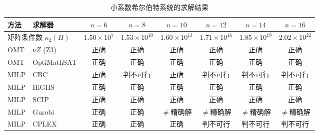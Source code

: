 \begin{table}[!htbp]
\centering
\caption{小系数希尔伯特系统的求解结果}
\label{tab:exp-illcond}
\footnotesize
\setlength{\tabcolsep}{4pt}
\begin{tabular}{@{}ll cccccc@{}}
\toprule
\textbf{方法} & \textbf{求解器} & $n{=}6$ & $n{=}8$ & $n{=}10$ & $n{=}12$ & $n{=}14$ & $n{=}16$ \\
\midrule
\multicolumn{2}{l}{矩阵条件数 $\kappa_2(H)$} & $1.50\!\times\!10^7$ & $1.53\!\times\!10^{10}$ & $1.60\!\times\!10^{13}$ & $1.71\!\times\!10^{16}$ & $1.85\!\times\!10^{19}$ & $2.02\!\times\!10^{22}$ \\
\midrule
OMT  & $\nu Z$ (Z3)  & 正确 & 正确 & 正确 & 正确 & 正确 & 正确 \\
OMT  & OptiMathSAT  & 正确 & 正确 & 正确 & 正确 & 正确 & 正确 \\
\midrule
MILP & CBC          & 正确 & 判不可行 & 正确 & 判不可行 & 判不可行 & 判不可行 \\
MILP & HiGHS        & 正确 & 正确 & 正确 & 正确 & 正确 & 正确 \\
MILP & SCIP         & 正确 & 正确 & 正确 & 正确 & 正确 & 正确 \\
MILP & Gurobi       & 正确 & 正确 & $\ne$精确解 & $\ne$精确解 & $\ne$精确解 & $\ne$精确解 \\
MILP & CPLEX        & 正确 & 正确 & 正确 & 判不可行 & 判不可行 & 判不可行 \\
\bottomrule
\end{tabular}
\end{table}
